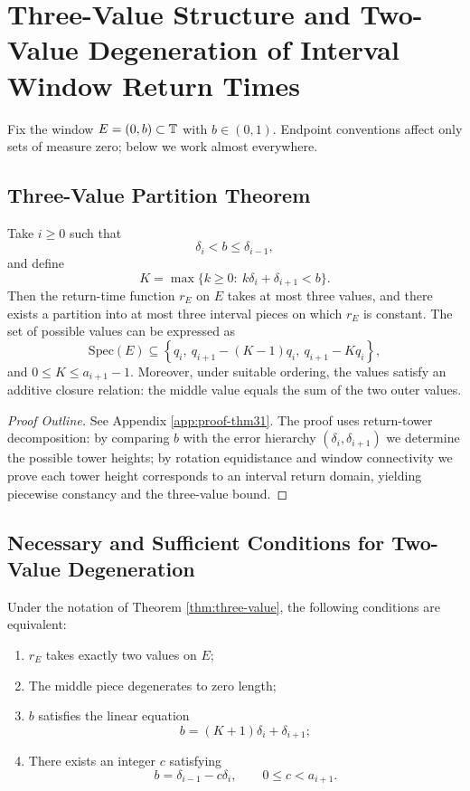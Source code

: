 \section{Three-Value Structure and Two-Value Degeneration of Interval Window Return Times}

Fix the window $E=(0,b)\subset\mathbb{T}$ with $b\in(0,1)$. Endpoint conventions affect only sets of measure zero; below we work almost everywhere.

\subsection{Three-Value Partition Theorem}

\begin{theorem}\label{thm:three-value}
Take $i\ge 0$ such that
\[
\delta_i<b\le \delta_{i-1},
\]
and define
\[
K=\max\{k\ge 0:\ k\delta_i+\delta_{i+1}<b\}.
\]
Then the return-time function $r_E$ on $E$ takes at most three values, and there exists a partition into at most three interval pieces on which $r_E$ is constant. The set of possible values can be expressed as
\[
\mathrm{Spec}(E)\subseteq \left\{q_i,\ q_{i+1}-(K-1)q_i,\ q_{i+1}-Kq_i\right\},
\]
and $0\le K\le a_{i+1}-1$. Moreover, under suitable ordering, the values satisfy an additive closure relation: the middle value equals the sum of the two outer values.
\end{theorem}

\begin{proof}[Proof Outline]
See Appendix \ref{app:proof-thm31}. The proof uses return-tower decomposition: by comparing $b$ with the error hierarchy $(\delta_i,\delta_{i+1})$ we determine the possible tower heights; by rotation equidistance and window connectivity we prove each tower height corresponds to an interval return domain, yielding piecewise constancy and the three-value bound.
\end{proof}

\subsection{Necessary and Sufficient Conditions for Two-Value Degeneration}

\begin{theorem}\label{thm:two-value-criterion}
Under the notation of Theorem \ref{thm:three-value}, the following conditions are equivalent:
\begin{enumerate}
  \item $r_E$ takes exactly two values on $E$;
  \item The middle piece degenerates to zero length;
  \item $b$ satisfies the linear equation
  \[
  b=(K+1)\delta_i+\delta_{i+1};
  \]
  \item There exists an integer $c$ satisfying
  \[
  b=\delta_{i-1}-c\delta_i,\qquad 0\le c<a_{i+1}.
  \]
\end{enumerate}
\end{theorem}

